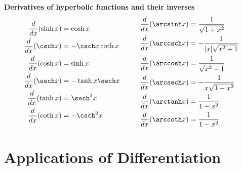 \documentclass{article}
\begin{document}
\begin{theorem}
	\textbf{Derivatives of hyperbolic functions and their inverses}
	\begin{align*}
		\begin{aligned}
			\frac{d}{dx}(\sinh x) & =\cosh x           \\
			\frac{d}{dx}(\csch x) & =-\csch x \coth x  \\
			\frac{d}{dx}(\cosh x) & =\sinh x           \\
			\frac{d}{dx}(\sech x) & = -\tanh x \sech x \\
			\frac{d}{dx}(\tanh x) & =\sech^2 x         \\
			\frac{d}{dx}(\coth x) & = -\csch^2 x
		\end{aligned}
		\hspace{1cm}
		\begin{aligned}
			\frac{d}{dx}(\arcsinh x) & =\frac{1}{\sqrt{1+x^2}}     \\
			\frac{d}{dx}(\arccsch x) & =-\frac{1}{|x|\sqrt{x^2+1}} \\
			\frac{d}{dx}(\arccosh x) & =\frac{1}{\sqrt{x^2-1}}     \\
			\frac{d}{dx}(\arcsech x) & = -\frac{1}{x\sqrt{1-x^2}}  \\
			\frac{d}{dx}(\arctanh x) & =\frac{1}{1-x^2}            \\
			\frac{d}{dx}(\arccoth x) & = \frac{1}{1-x^2}
		\end{aligned}
	\end{align*}
\end{theorem}
\section{Applications of Differentiation}
\end{document}
